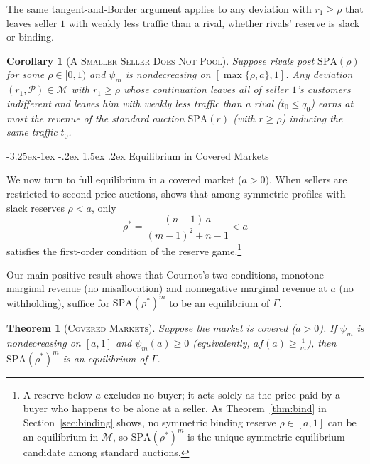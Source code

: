 \documentclass[12pt]{article}
\makeatletter
\newcommand{\citeasnoun}[1]{\citet{#1}}
\theoremstyle{mystyle}
\newtheorem{corollary}{Corollary}
\newtheorem{theorem}{Theorem}
\theoremstyle{mystyle2}
\newcommand{\mmpfont}{\scshape}
\renewcommand\subsection{\@startsection{subsection}{2}{\z@}%
                                     {-3.25ex\@plus -1ex \@minus -.2ex}%
                                     {1.5ex \@plus .2ex}%
                                     {\normalfont\normalsize\mmpfont}}
\newcommand{\M}{\mathcal{M}}
\newcommand{\cP}{\mathcal{P}}
\newcommand{\SPA}{\mathrm{SPA}}
\newcommand{\1}{\mathbf{1}}
\makeatother
\begin{document}
The same tangent-and-Border argument applies to any deviation with $r_1\ge\rho$ that leaves seller $1$ with weakly less traffic than a rival, whether rivals' reserve is slack or binding.

\begin{corollary}[\textsc{A Smaller Seller Does Not Pool}]\label{cor:smaller}
Suppose rivals post $\SPA(\rho)$ for some $\rho\in[0,1)$ and $\psi_m$ is nondecreasing on $[\max\{\rho,a\},1]$. Any deviation $(r_1,\cP)\in\M$ with $r_1\ge\rho$ whose continuation leaves all of seller $1$'s customers indifferent and leaves him with weakly less traffic than a rival ($t_0\le q_0$) earns at most the revenue of the standard auction $\SPA(r)$ (with $r\ge\rho$) inducing the same traffic $t_0$.
\end{corollary}

\subsection{Equilibrium in Covered Markets}

We now turn to full equilibrium in a covered market ($a>0$). When sellers are restricted to second price auctions, \citeasnoun{virag2010competing} shows that among symmetric profiles with slack reserves $\rho<a$, only
\begin{equation}\label{eq:rhostar}
\rho^* = \frac{(n-1)\,a}{(m-1)^2 + n - 1} < a
\end{equation}
satisfies the first-order condition of the reserve game.\footnote{A reserve below $a$ excludes no buyer; it acts solely as the price paid by a buyer who happens to be alone at a seller. As Theorem~\ref{thm:bind} in Section~\ref{sec:binding} shows, no symmetric binding reserve $\rho\in[a,1]$ can be an equilibrium in $\M$, so $\SPA(\rho^*)^m$ is the unique symmetric equilibrium candidate among standard auctions.}

Our main positive result shows that Cournot's two conditions, monotone marginal revenue (no misallocation) and nonnegative marginal revenue at $a$ (no withholding), suffice for $\SPA(\rho^*)^m$ to be an equilibrium of $\Gamma$.

\begin{theorem}[\textsc{Covered Markets}]\label{thm:covered}
Suppose the market is covered ($a>0$). If $\psi_m$ is nondecreasing on $[a,1]$ and $\psi_m(a)\ge 0$ (equivalently, $a f(a)\ge\frac{1}{m}$), then $\SPA(\rho^*)^m$ is an equilibrium of $\Gamma$.
\end{theorem}
\end{document}
